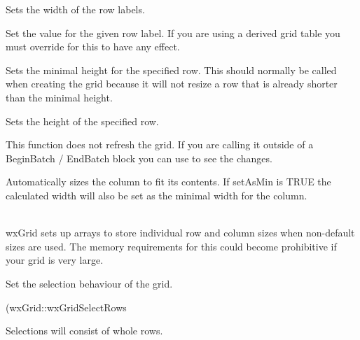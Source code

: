 {\label{wxgridsetrowlabelsize}


Sets the width of the row labels.

\label{wxgridsetrowlabelvalue}


Set the value for the given row label. If you are using a derived grid table you must 
override 
for this to have any effect.

\label{wxgridsetrowminimalheight}


Sets the minimal height for the specified row. This should normally be called when creating the grid
because it will not resize a row that is already shorter than the minimal height.

\label{wxgridsetrowsize}


Sets the height of the specified row. 

This function does not refresh the grid. If you are calling it outside of a BeginBatch / EndBatch
block you can use  to see the changes. 

Automatically sizes the column to fit its contents.  If setAsMin is TRUE the calculated width will
also be set as the minimal width for the column.

 \\
wxGrid sets up arrays to store individual row and column sizes when non-default sizes are used.
The memory requirements for this could become prohibitive if your grid is very large. 

\label{wxgridsetselectionmode}


Set the selection behaviour of the grid.



\docparam(wxGrid::wxGridSelectRows}{Selections will consist of whole rows.}


